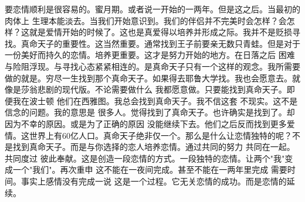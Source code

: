 要恋情顺利是很容易的。蜜月期。或者说一开始的一两年。但是这之后。当最初的肉体上 生理本能淡去。当我们开始意识到。我们的伴侣并不完美时会怎样？会怎样？这就是爱情开始的时候了。这也是真爱得以培养并形成之际。我并不是贬损寻找。真命天子的重要性。这当然重要。通常找到王子前要亲无数只青蛙。但是对于一份美好而持久的恋情。培养更重要。这才是努力开始的地方。在日落之后 困难与险阻浮现。与寻找心态紧紧相连的。是真命天子只有一个这样的观念。我所需要做的就是。穷尽一生找到那个真命天子。如果得去耶鲁大学找。我也会愿意去。就像是莎翁悲剧的现代版。不论需要做什么 我都愿意做。只要能找到真命天子。即便我在波士顿 他们在西雅图。我总会找到真命天子。我不信这套 不现实。这不是信念的问题。我的意思是 很多人。觉得找到了真命天子。也许确实是找到了。却因为不幸的原因。或是为了正确的原因 没能继续下去。他们之后反而找到更多爱情。这世界上有60亿人口。真命天子绝非仅一个。那么是什么让恋情独特的呢？不是找到真命天子。而是与你选择的恋人培养恋情。通过共同的努力 共同在一起。共同度过 彼此奉献。这是创造一段恋情的方式。一段独特的恋情。让两个"我"变成一个"我们"。再次重申 这不能在一夜间完成。甚至不能在一两年里完成 需要时间。事实上感情没有完成一说 这是一个过程。它无关恋情的成功。而是恋情的延续。 
%
